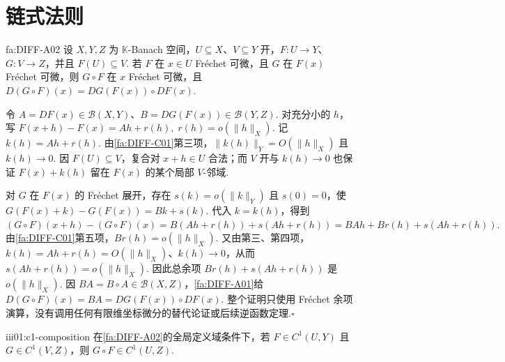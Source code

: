 \section{链式法则}\label{sec:iii01-chain-rule}

\begin{FATheorem}{fa:DIFF-A02}
设 \(\displaystyle X,Y,Z\) 为 \(\displaystyle\mathbb K\)-Banach 空间，\(\displaystyle U\subseteq X\)、\(\displaystyle V\subseteq Y\) 开，\(\displaystyle F:U\to Y\)、\(\displaystyle G:V\to Z\)，并且 \(\displaystyle F(U)\subseteq V\). 若 \(\displaystyle F\) 在 \(\displaystyle x\in U\) Fréchet 可微，且 \(\displaystyle G\) 在 \(\displaystyle F(x)\) Fréchet 可微，则 \(\displaystyle G\circ F\) 在 \(\displaystyle x\) Fréchet 可微，且
\(\displaystyle D(G\circ F)(x) = DG(F(x))\circ DF(x).\)
\end{FATheorem}

\begin{FAProof}
令 \(\displaystyle A=DF(x)\in\mathcal B(X,Y)\)、\(\displaystyle B=DG(F(x))\in\mathcal B(Y,Z)\). 对充分小的 \(\displaystyle h\)，写
\(\displaystyle F(x+h)-F(x) = Ah+r(h), \; r(h)=o(\|h\|_X).\)
记 \(\displaystyle k(h)=Ah+r(h)\). 由\autoref{fa:DIFF-C01}第三项，\(\displaystyle\|k(h)\|_Y=O(\|h\|_X)\) 且 \(\displaystyle k(h)\to0\). 因 \(\displaystyle F(U)\subseteq V\)，复合对 \(\displaystyle x+h\in U\) 合法；而 \(\displaystyle V\) 开与 \(\displaystyle k(h)\to0\) 也保证 \(\displaystyle F(x)+k(h)\) 留在 \(\displaystyle F(x)\) 的某个局部 \(\displaystyle V\)-邻域.

对 \(\displaystyle G\) 在 \(\displaystyle F(x)\) 的 Fréchet 展开，存在 \(\displaystyle s(k)=o(\|k\|_Y)\) 且 \(\displaystyle s(0)=0\)，使
\(\displaystyle G(F(x)+k)-G(F(x)) = Bk+s(k).\)
代入 \(\displaystyle k=k(h)\)，得到
\(\displaystyle (G\circ F)(x+h)-(G\circ F)(x) =B(Ah+r(h))+s(Ah+r(h)) =BAh+Br(h)+s(Ah+r(h)).\)
由\autoref{fa:DIFF-C01}第五项，\(\displaystyle Br(h)=o(\|h\|_X)\). 又由第三、第四项，\(\displaystyle k(h)=Ah+r(h)=O(\|h\|_X)\)、\(\displaystyle k(h)\to0\)，从而
\(\displaystyle s(Ah+r(h)) = o(\|h\|_X).\)
因此总余项 \(\displaystyle Br(h)+s(Ah+r(h))\) 是 \(\displaystyle o(\|h\|_X)\). 因 \(\displaystyle BA=B\circ A\in\mathcal B(X,Z)\)，\autoref{fa:DIFF-A01}给
\(\displaystyle D(G\circ F)(x)=BA=DG(F(x))\circ DF(x).\)
整个证明只使用 Fréchet 余项演算，没有调用任何有限维坐标微分的替代论证或后续逆函数定理.\hfill\(\square\)
\end{FAProof}

\begin{FAProposition}[B][\(\displaystyle C^1\) 复合]{iii01:c1-composition}
在\autoref{fa:DIFF-A02}的全局定义域条件下，若 \(\displaystyle F\in C^1(U,Y)\) 且 \(\displaystyle G\in C^1(V,Z)\)，则 \(\displaystyle G\circ F\in C^1(U,Z)\).
\end{FAProposition}

